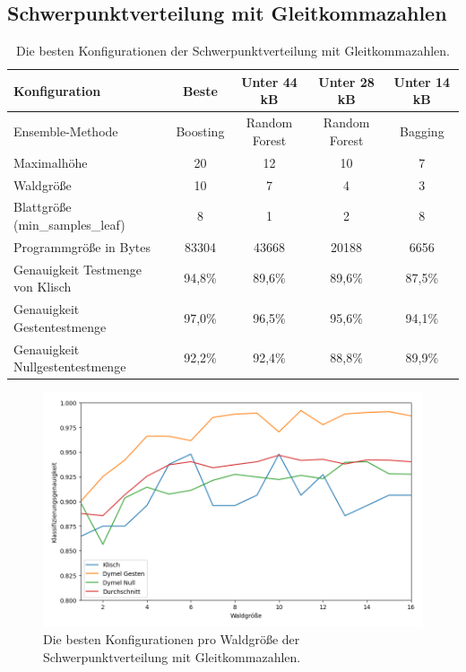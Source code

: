 \subsection{Schwerpunktverteilung mit Gleitkommazahlen}
\begin{table}[h!]
    \hspace{-0.75cm}
    \begin{tabular}{ | l | c | c | c | c |}
        \hline
        Konfiguration & Beste & Unter 44 kB & Unter 28 kB & Unter 14 kB \\\hline
        Ensemble-Methode & Boosting & Random Forest & Random Forest & Bagging  \\\hline
        Maximalhöhe & 20 & 12 & 10 & 7 \\\hline
        Waldgröße & 10 & 7 & 4 & 3 \\\hline
        Blattgröße (min\_samples\_leaf) & 8 & 1 & 2 & 8 \\\hline
        Programmgröße in Bytes & 83304 & 43668 & 20188 & 6656 \\\hline
        Genauigkeit Testmenge von Klisch & 94,8\% & 89,6\% & 89,6\% & 87,5\% \\\hline
        Genauigkeit Gestentestmenge & 97,0\% & 96,5\% & 95,6\% & 94,1\% \\\hline
        Genauigkeit Nullgestentestmenge & 92,2\% & 92,4\% & 88,8\% & 89,9\% \\\hline
    \end{tabular}
    \caption{Die besten Konfigurationen der Schwerpunktverteilung mit Gleitkommazahlen.}
    \label{tab:schwerpunktverteilung_float}
\end{table}
\begin{figure}[h!]
    \centering
    \includegraphics[width=\linewidth]{images/cocd_float_acc_per_size.png}
    \caption{Die besten Konfigurationen pro Waldgröße der Schwerpunktverteilung mit Gleitkommazahlen.}
    \label{fig:cocd_float_per_forest_size}
\end{figure}
